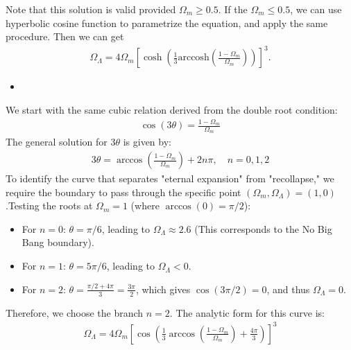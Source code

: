 Note that this solution is valid provided $\Omega_m\geq0.5$. If the $\Omega_m\leq0.5$, we can use hyperbolic cosine function to parametrize the equation, and apply the same procedure. Then we can get 
\begin{align}
    \Omega_\Lambda=4 \Omega_m\left[\cosh\left(\frac{1}{3}\text{arccosh}\left(\frac{1-\Omega_m}{\Omega_m}\right)\right)\right]^3.
\end{align}

\begin{itemize}
    \item [(b)]
\end{itemize}
We start with the same cubic relation derived from the double root condition:
\begin{align}
    \cos(3\theta) = \frac{1-\Omega_m}{\Omega_m}
\end{align}
The general solution for $3\theta$ is given by:
\begin{align}
    3\theta = \arccos\left(\frac{1-\Omega_m}{\Omega_m}\right) + 2n\pi, \quad n = 0, 1, 2
\end{align}
To identify the curve that separates "eternal expansion" from "recollapse," we require the boundary to pass through the specific point $(\Omega_m, \Omega_\Lambda) = (1, 0)$.Testing the roots at $\Omega_m = 1$ (where $\arccos(0) = \pi/2$):
\begin{itemize}
    \item For $n=0$: $\theta = \pi/6$, leading to $\Omega_\Lambda \approx 2.6$ (This corresponds to the No Big Bang boundary).
    \item For $n=1$: $\theta = 5\pi/6$, leading to $\Omega_\Lambda < 0$.
    \item For $n=2$: $\theta = \frac{\pi/2 + 4\pi}{3} = \frac{3\pi}{2}$, which gives $\cos(3\pi/2) = 0$, and thus $\Omega_\Lambda = 0$.
\end{itemize}
Therefore, we choose the branch $n=2$. The analytic form for this curve is:
\begin{align}
    \Omega_\Lambda = 4 \Omega_m \left[ \cos \left( \frac{1}{3} \arccos \left( \frac{1-\Omega_m}{\Omega_m} \right) + \frac{4\pi}{3} \right) \right]^3
\end{align}

